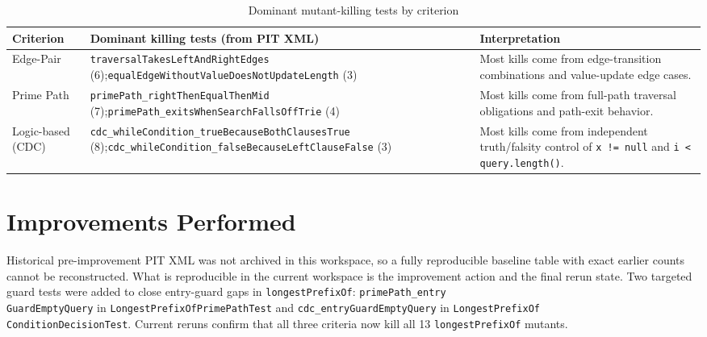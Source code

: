 \begin{table}[H]
	\centering
	\scriptsize
	\setlength{\tabcolsep}{3pt}
	\renewcommand{\arraystretch}{1.15}
	\begin{tabular}{|p{2.1cm}|p{4.9cm}|p{6.6cm}|}
		\hline
		Criterion & Dominant killing tests (from PIT XML) & Interpretation \\
		\hline
		Edge-Pair & \texttt{traversalTakesLeftAnd}\newline \texttt{RightEdges} (6);\newline \texttt{equalEdgeWithoutValue}\newline \texttt{DoesNotUpdateLength} (3) & Most kills come from edge-transition combinations and value-update edge cases. \\
		\hline
		Prime Path & \texttt{primePath\_rightThen}\newline \texttt{EqualThenMid} (7);\newline \texttt{primePath\_exitsWhen}\newline \texttt{SearchFallsOffTrie} (4) & Most kills come from full-path traversal obligations and path-exit behavior. \\
		\hline
		Logic-based (CDC) & \texttt{cdc\_whileCondition\_true}\newline \texttt{BecauseBothClausesTrue} (8);\newline \texttt{cdc\_whileCondition\_false}\newline \texttt{BecauseLeftClauseFalse} (3) & Most kills come from independent truth/falsity control of \texttt{x != null} and \texttt{i < query.length()}. \\
		\hline
	\end{tabular}
	\normalsize
	\caption{Dominant mutant-killing tests by criterion}
\end{table}

\section{Improvements Performed}

Historical pre-improvement PIT XML was not archived in this workspace, so a fully reproducible baseline table with exact earlier counts cannot be reconstructed.
What is reproducible in the current workspace is the improvement action and the final rerun state.
Two targeted guard tests were added to close entry-guard gaps in \texttt{longestPrefixOf}:
\texttt{primePath\_entry\\GuardEmptyQuery} in \texttt{LongestPrefixOfPrimePathTest} and
\texttt{cdc\_entryGuardEmptyQuery} in \texttt{LongestPrefixOf\\ConditionDecisionTest}.
Current reruns confirm that all three criteria now kill all 13 \texttt{longestPrefixOf} mutants.
